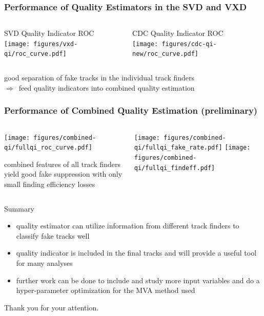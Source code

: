 \documentclass[18pt, aspectratio=169]{beamer}
\begin{document}
\begin{frame}
  \frametitle{Performance of Quality Estimators in the SVD and VXD}
  \begin{columns}
    \begin{column}{.5\textwidth}
      \center
      SVD Quality Indicator ROC\\
      \texttt{[image: figures/vxd-qi/roc\_curve.pdf]}
    \end{column}
    \begin{column}{.5\textwidth}
      \center
      CDC Quality Indicator ROC\\
      \texttt{[image: figures/cdc-qi-new/roc\_curve.pdf]}
    \end{column}
  \end{columns}
  \begin{block}{}
  good separation of fake tracks in the individual track finders\\
  $\Rightarrow$~feed quality indicators into combined quality estimation
  \end{block}

\end{frame}
\begin{frame}
  \frametitle{Performance of Combined Quality Estimation (preliminary)}
  \begin{columns}
    \begin{column}{.65\textwidth}
      \center
      \texttt{[image: figures/combined-qi/fullqi\_roc\_curve.pdf]}
      \begin{block}{}
        combined features of all track finders yield good fake suppression with only small finding
        efficiency losses
      \end{block}


    \end{column}
    \begin{column}{.35\textwidth}
      \center
      \texttt{[image: figures/combined-qi/fullqi\_fake\_rate.pdf]}
      \texttt{[image: figures/combined-qi/fullqi\_findeff.pdf]}
    \end{column}
  \end{columns}
\end{frame}
\begin{frame}
  \begin{block}{Summary}
    \begin{itemize}
    \item quality estimator can utilize information from different track finders to
      classify fake tracks well
    \item quality indicator is included in the final tracks and will provide a useful tool for many
      analyses
    \item further work can be done to include and study more input variables and do a
      hyper-parameter optimization for the MVA method used
    \end{itemize}
  \end{block}

  \vspace{3cm}
  \Large Thank you for your attention.
\end{frame}
\end{document}
